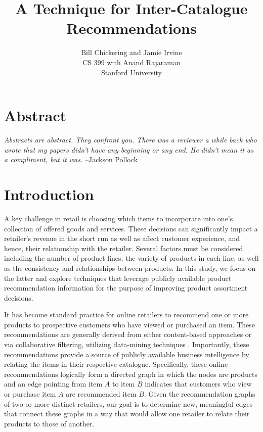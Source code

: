 \documentclass[11pt]{article}
\begin{document}

\title{A Technique for Inter-Catalogue Recommendations}
\author{Bill Chickering and Jamie Irvine\\
CS 399 with Anand Rajaraman\\
Stanford University}
\renewcommand{\today}{June 11, 2014}
\maketitle

\section*{Abstract}
\emph{Abstracts are abstract. They confront you. There was a reviewer a
while back who wrote that my papers didn't have any beginning or any end. He
didn't mean it as a compliment, but it was.} --Jackson Pollock

\section*{Introduction}
A key challenge in retail is choosing which items to incorporate into one's
collection of offered goods and services. These decisions can significantly
impact a retailer's revenue in the short run as well as affect customer
experience, and hence, their relationship with the retailer. Several factors
must be considered including the number of product lines, the variety of
products in each line, as well as the consistency and relationships between
products. In this study, we focus on the latter and explore techniques that
leverage publicly available product recommendation information for the purpose
of improving product assortment decisions.

It has become standard practice for online retailers to recommend one or more
products to prospective customers who have viewed or purchased an item. These
recommendations are generally derived from either content-based approaches or
via collaborative filtering, utilizing data-mining techniques \cite{Ricci2011}.
Importantly, these recommendations provide a source of publicly available
business intelligence by relating the items in their respective catalogue.
Specifically, these online recommendations logically form a directed graph in
which the nodes are products and an edge pointing from item $A$ to item $B$
indicates that customers who view or purchase item $A$ are recommended item $B$.
Given the recommendation graphs of two or more distinct retailers, our goal is
to determine new, meaningful edges that connect these graphs in a way that would
allow one retailer to relate their products to those of another.
\end{document}
